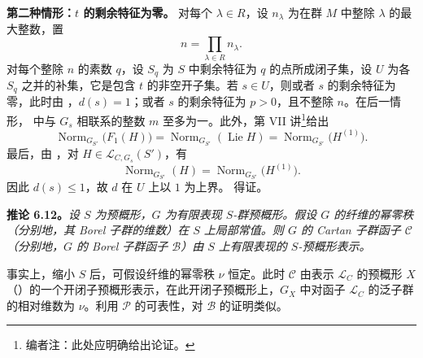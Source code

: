 \textbf{第二种情形：\(t\) 的剩余特征为零。}
对每个 \(\lambda\in R\)，设 \(n_\lambda\) 为在群 \(M\) 中整除 \(\lambda\) 的最大整数，置
\[
n=\prod_{\lambda\in R}n_\lambda.
\]
对每个整除 \(n\) 的素数 \(q\)，设 \(S_q\) 为 \(S\) 中剩余特征为 \(q\) 的点所成闭子集，设 \(U\) 为各 \(S_q\) 之并的补集，它是包含 \(t\) 的非空开子集。若 \(s\in U\)，则或者 \(s\) 的剩余特征为零，此时由 ，\(d(s)=1\)；或者 \(s\) 的剩余特征为 \(p>0\)，且不整除 \(n\)。在后一情形， 中与 \(G_s\) 相联系的整数 \(m\) 至多为一。此外，第 VII 讲\footnote{编者注：此处应明确给出论证。}给出
\[
\operatorname{Norm}_{G_{S'}}\bigl(F_1(H)\bigr)
 =\operatorname{Norm}_{G_{S'}}(\operatorname{Lie}H)
 =\operatorname{Norm}_{G_{S'}}\bigl(H^{(1)}\bigr).
\]
最后，由 ，对 \(H\in\mathcal L_{C,G_s}(S')\)，有
\[
\operatorname{Norm}_{G_{S'}}(H)
 =\operatorname{Norm}_{G_{S'}}\bigl(H^{(1)}\bigr).
\]
因此 \(d(s)\leq1\)，故 \(d\) 在 \(U\) 上以 \(1\) 为上界。 得证。

\textbf{推论 6.12。}\emph{设 \(S\) 为预概形，\(G\) 为有限表现 \(S\)-群预概形。假设 \(G\) 的纤维的幂零秩（分别地，其 Borel 子群的维数）在 \(S\) 上局部常值。则 \(G\) 的 Cartan 子群函子 \(\mathcal C\)（分别地，\(G\) 的 Borel 子群函子 \(\mathcal B\)）由 \(S\) 上有限表现的 \(S\)-预概形表示。}

事实上，缩小 \(S\) 后，可假设纤维的幂零秩 \(\nu\) 恒定。此时 \(\mathcal C\) 由表示 \(\mathcal L_C\) 的预概形 \(X\)（）的一个开闭子预概形表示，在此开闭子预概形上，\(G_X\) 中对函子 \(\mathcal L_C\) 的泛子群的相对维数为 \(\nu\)。利用 \(\mathcal P\) 的可表性，对 \(\mathcal B\) 的证明类似。


